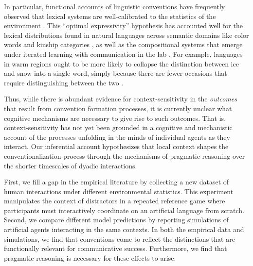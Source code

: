 In particular, functional accounts of linguistic conventions have frequently observed that lexical systems are well-calibrated to the statistics of the environment \cite{gibson2019efficiency}.
This ``optimal expressivity'' hypothesis has accounted well for the lexical distributions found in natural languages across semantic domains like color words and kinship categories \cite{KempRegier12_KinshipCategories,regier201511,gibson2017color,kemp2018semantic}, as well as the compositional systems that emerge under iterated learning with communication in the lab \cite{WintersKirbySmith14_LanguagesAdapt, KirbyTamarizCornishSmith15_CompressionCommunication}. 
For example, languages in warm regions ought to be more likely to collapse the distinction between ice and snow into a single word, simply because there are fewer occasions that require distinguishing between the two \cite{regier2016languages}. 

Thus, while there is abundant evidence for context-sensitivity in the \emph{outcomes} that result from convention formation processes, it is currently unclear what cognitive mechanisms are necessary to give rise to such outcomes.
That is, context-sensitivity has not yet been grounded in a cognitive and mechanistic account of the processes unfolding in the minds of individual agents as they interact.
Our inferential account hypothesizes that local context shapes the conventionalization process through the mechanisms of pragmatic reasoning over the shorter timescales of dyadic interactions.


First, we fill a gap in the empirical literature by collecting a new dataset of human interactions under different environmental statistics.
This experiment manipulates the context of distractors in a repeated reference game where participants must interactively coordinate on an artificial language from scratch. %
Second, we compare different model predictions by reporting simulations of artificial agents interacting in the same contexts.
In both the empirical data and simulations, we find that conventions come to reflect the distinctions that are functionally relevant for communicative success. 
Furthermore, we find that pragmatic reasoning is necessary for these effects to arise. 

